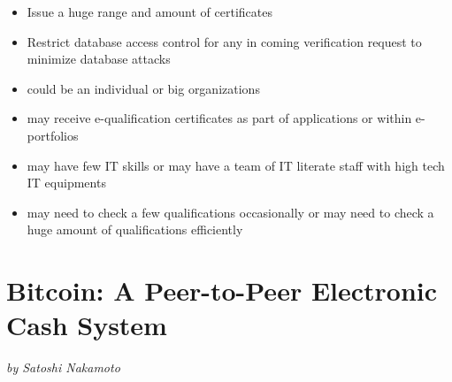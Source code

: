 
\begin{itemize}
    \item Issue a huge range and amount of certificates

    \item Restrict database access control for any in coming verification request to minimize database attacks
  \end{itemize}

    \begin{itemize}
        \item could be an individual or big organizations
        \item may receive e-qualification certificates as part of applications or within e-portfolios
\item may have few IT skills or may have a team of IT literate staff with high tech IT equipments
\item may need to check a few qualifications occasionally or may need to check a huge amount of qualifications efficiently
      \end{itemize}
    
\section*{Bitcoin: A Peer-to-Peer Electronic Cash System
}

\textit{by Satoshi Nakamoto }\\

